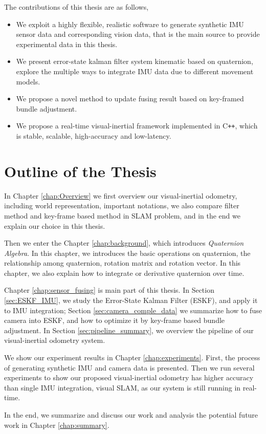 The contributions of this thesis are as follows,
\begin{itemize}
\item {We exploit a highly flexible, realistic software to generate synthetic IMU sensor data and corresponding vision data, that is the main source to provide experimental data in this thesis.}
\item {We present error-state kalman filter system kinematic based on quaternion, explore the multiple ways to integrate IMU data due to different movement models.}
\item {We propose a novel method to update fusing result based on key-framed bundle adjustment.}
\item {We propose a real-time visual-inertial framework implemented in C\texttt{++}, which is stable, scalable, high-accuracy and low-latency.}
\end{itemize}

\section{Outline of the Thesis}
\label{sec:outline}

In Chapter \ref{chap:Overview} we first overview our visual-inertial odometry, including world representation, important notations, we also compare filter method and key-frame based method in SLAM problem, and in the end we explain our choice in this thesis.

Then we enter the Chapter \ref{chap:background}, which introduces \textit{Quaternion Algebra}. In this chapter, we introduces the basic operations on quaternion, the relationship among quaternion, rotation matrix and rotation vector. In this chapter, we also explain how to integrate or derivative quaternion over time.

Chapter \ref{chap:sensor_fusing} is main part of this thesis. In Section \ref{sec:ESKF_IMU}, we study the Error-State Kalman Filter (ESKF), and apply it to IMU integration; Section \ref{sec:camera_comple_data} we summarize how to fuse camera into ESKF, and how to optimize it by key-frame based bundle adjustment. In Section 
\ref{sec:pipeline_summary}, we overview the pipeline of our visual-inertial odometry system.

We show our experiment results in Chapter \ref{chap:experiments}. First, the process of generating synthetic IMU and camera data is presented. Then we run several experiments to show our proposed visual-inertial odometry has higher accuracy than  single IMU integration, visual SLAM, as our system is still running in real-time.

In the end, we summarize and discuss our work and analysis the potential future work in Chapter \ref{chap:summary}.
